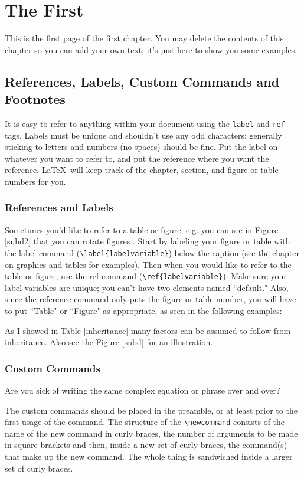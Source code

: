 \documentclass[12pt,twoside]{reedthesis}
\begin{document}
    \chapter{The First}
    	This is the first page of the first chapter. You may delete the contents of this chapter so you can add your own text; it's just here to show you some examples. 
	
\section{References, Labels, Custom Commands and Footnotes}
It is easy to refer to anything within your document using the \texttt{label} and \texttt{ref} tags.  Labels must be unique and shouldn't use any odd characters; generally sticking to letters and numbers (no spaces) should be fine. Put the label on whatever you want to refer to, and put the reference where you want the reference. \LaTeX\ will keep track of the chapter, section, and figure or table numbers for you. 

\subsection{References and Labels}
Sometimes you'd like to refer to a table or figure, e.g. you can see in Figure \ref{subd2} that you can rotate figures . Start by labeling your figure or table with the label command (\verb=\label{labelvariable}=) below the caption (see the chapter on graphics and tables for examples). Then when you would like to refer to the table or figure, use the ref command (\verb=\ref{labelvariable}=). Make sure your label variables are unique; you can't have two elements named ``default." Also, since the reference command only puts the figure or table number, you will have to put  ``Table" or ``Figure" as appropriate, as seen in the following examples:

 As I showed in Table \ref{inheritance} many factors can be assumed to follow from inheritance. Also see the Figure \ref{subd} for an illustration.
 
\subsection{Custom Commands}\label{commands}
Are you sick of writing the same complex equation or phrase over and over? 

The custom commands should be placed in the preamble, or at least prior to the first usage of the command. The structure of the \verb=\newcommand= consists of the name of the new command in curly braces, the number of arguments to be made in square brackets and then, inside a new set of curly braces, the command(s) that make up the new command. The whole thing is sandwiched inside a larger set of curly braces. 
\end{document}
